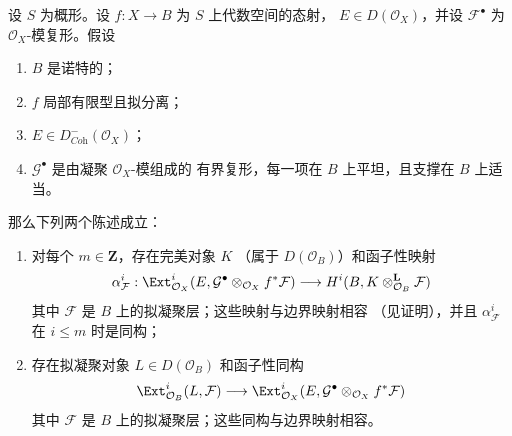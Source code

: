 \begin{lemma}
\label{lemma-compute-ext}
设 $S$ 为概形。设 $f : X \to B$ 为 $S$ 上代数空间的态射，
$E \in D(\mathcal{O}_X)$，并设 $\mathcal{F}^\bullet$ 为 %
$\mathcal{O}_X$-模复形。假设
\begin{enumerate}
\item $B$ 是诺特的；
\item $f$ 局部有限型且拟分离；
\item $E \in D^-_{\textit{Coh}}(\mathcal{O}_X)$；
\item $\mathcal{G}^\bullet$ 是由凝聚 $\mathcal{O}_X$-模组成的
有界复形，每一项在 $B$ 上平坦，且支撑在 $B$ 上适当。%
\end{enumerate}
那么下列两个陈述成立：
\begin{enumerate}
\item[(A)] 对每个 $m \in \mathbf{Z}$，存在完美对象 $K$
（属于 $D(\mathcal{O}_B)$）和函子性映射
$$
\alpha^i_\mathcal{F} :
\Ext^i_{\mathcal{O}_X}(E,
\mathcal{G}^\bullet \otimes_{\mathcal{O}_X} f^*\mathcal{F})
\longrightarrow
H^i(B, K \otimes^\mathbf{L}_{\mathcal{O}_B} \mathcal{F})
$$
其中 $\mathcal{F}$ 是 $B$ 上的拟凝聚层；这些映射与边界映射相容
（见证明），并且 $\alpha^i_\mathcal{F}$ 在 $i \leq m$ 时是同构；
\item[(B)] 存在拟凝聚对象 $L \in D(\mathcal{O}_B)$ 和函子性同构
$$
\Ext^i_{\mathcal{O}_B}(L, \mathcal{F}) \longrightarrow
\Ext^i_{\mathcal{O}_X}(E,
\mathcal{G}^\bullet \otimes_{\mathcal{O}_X} f^*\mathcal{F})
$$
其中 $\mathcal{F}$ 是 $B$ 上的拟凝聚层；这些同构与边界映射相容。
\end{enumerate}
\end{lemma}

